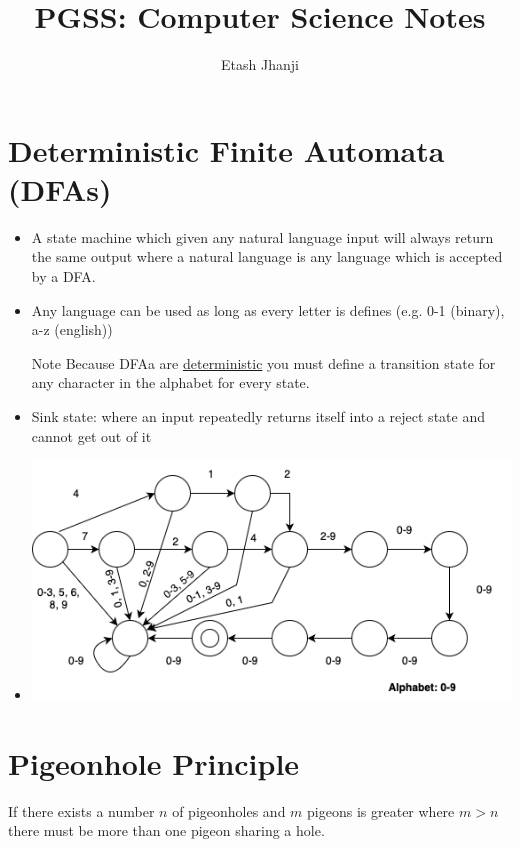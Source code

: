 \documentclass[12pt,letterpaper, twocolumn]{article}
\author{Etash Jhanji}
\title{PGSS: Computer Science Notes}
\date{}
\begin{document}
\maketitle


\section{Deterministic Finite Automata (DFAs)}

\begin{itemize}
    \item A state machine which given any natural language input will always return the same output where a natural language is any language which is accepted by a DFA.\@
    \item Any language can be used as long as every letter is defines (e.g. 0-1 (binary), a-z (english))
    \item[Note] Because DFAa are \underline{deterministic} you must define a transition state for any character in the alphabet for every state. 
    \item Sink state: where an input repeatedly returns itself into a reject state and cannot get out of it
    \item \begin{center}\includegraphics*[width=0.85\columnwidth]{DFA_phone.png}\end{center}
\end{itemize}

\section{Pigeonhole Principle}
If there exists a number $n$ of pigeonholes and $m$ pigeons is greater where $m>n$ there must be more than one pigeon sharing a hole. 
\end{document}
